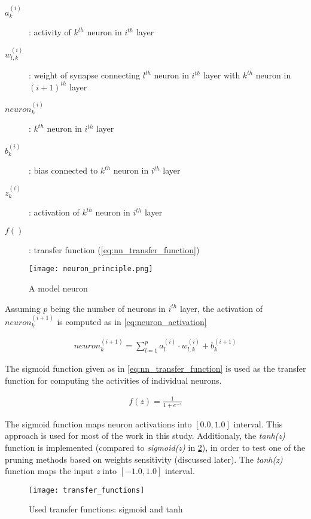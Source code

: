 \begin{description}
\item[$ a_k^{(i)} $] : activity of $ k^{th} $ neuron in $ i^{th} $ layer
\item[$ w_{l, k}^{(i)} $] : weight of synapse connecting $ l^{th} $ neuron in $ i^{th} $ layer with $ k^{th} $ neuron in $ (i+1)^{th} $ layer
\item[$ neuron_k^{(i)} $] : $ k^{th} $ neuron in $ i^{th} $ layer
\item[$ b_k^{(i)} $] : bias connected to $ k^{th} $ neuron in $ i^{th} $ layer
\item[$ z_k^{(i)} $] : activation of $ k^{th} $ neuron in $ i^{th} $ layer
\item[$ f() $] : transfer function (\cref{eq:nn_transfer_function})
\end{description}

\begin{figure}[H]
  \centering
  \texttt{[image: neuron\_principle.png]}
  \caption{A model neuron}
  \label{img:model_neuron}
\end{figure}

Assuming $ p $ being the number of neurons in $ i^{th} $ layer, the activation of $ neuron_k^{(i+1)} $ is computed as in \ref{eq:neuron_activation}

\begin{align} \label{eq:neuron_activation}
neuron_k^{(i+1)} = \displaystyle{\sum_{l=1}^{p} a_l^{(i)} \cdot w_{l,k}^{(i)}} + b_k^{(i+1)}
\end{align}

The sigmoid function given as in \cref{eq:nn_transfer_function} is used as the transfer function for computing the activities of individual neurons.

\begin{align} \label{eq:nn_transfer_function}
f(z) = \frac{1}{1 + e^{-z}}
\end{align}

The sigmoid function maps neuron activations into $ [0.0, 1.0] $ interval. This approach is used for most of the work in this study. Additionaly, the \textit{tanh(z)} function is implemented (compared to \textit{sigmoid(z)} in \cref{img:sigmoid}), in order to test one of the pruning methods based on weights sensitivity (discussed later). The \textit{tanh(z)} function maps the input \textit{z} into $ [-1.0, 1.0] $ interval.

\begin{figure}[H]
  \centering
  \texttt{[image: transfer\_functions]}
  \caption{Used transfer functions: sigmoid and tanh}
  \label{img:sigmoid}
\end{figure}

